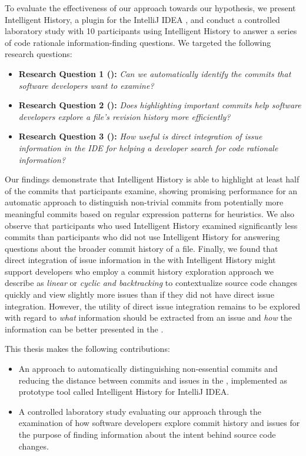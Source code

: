 To evaluate the effectiveness of our approach towards our hypothesis, 
we present Intelligent History, a plugin for the IntelliJ IDEA ,
and conduct a controlled laboratory study with 10 participants using Intelligent History to answer a series of code rationale information-finding questions.
We targeted the following research questions:

\begin{itemize}[leftmargin=*]
    \item[] \textbf{Research Question 1 ():} \textit{Can we automatically identify the commits that software developers want to examine?}
    \item[] \textbf{Research Question 2 ():} \textit{Does highlighting important commits help software developers explore a file’s revision history more efficiently?}
    \item[] \textbf{Research Question 3 ():} \textit{How useful is direct integration of issue information in the IDE for helping a developer search for code rationale information?}
\end{itemize}

Our findings demonstrate that Intelligent History is able to highlight at least half of
the commits that participants examine, showing promising performance for
an automatic approach to distinguish non-trivial commits from potentially
more meaningful commits based on regular expression patterns for heuristics.
We also observe that participants who used Intelligent History examined significantly
less commits than participants who did not use Intelligent History for answering
questions about the broader commit history of a file.
Finally, we found that direct integration of issue information in the 
with Intelligent History might support developers who employ a commit history exploration approach
we describe as \textit{linear} or \textit{cyclic and backtracking} to contextualize
source code changes quickly and view slightly more issues than if they did not have
direct issue integration. 
However, the utility of direct issue integration remains to be explored with
regard to \emph{what} information should be extracted from an issue
and \emph{how} the information can be better presented in the .

This thesis makes the following contributions:
\begin{itemize}
	\item An approach to automatically distinguishing non-essential commits and reducing the distance between commits and issues in the , 
		implemented as prototype tool called Intelligent History for IntelliJ IDEA.
	\item A controlled laboratory study evaluating our approach through the examination of how software developers explore commit history and issues
		for the purpose of finding information about the intent behind source code changes.
\end{itemize}

